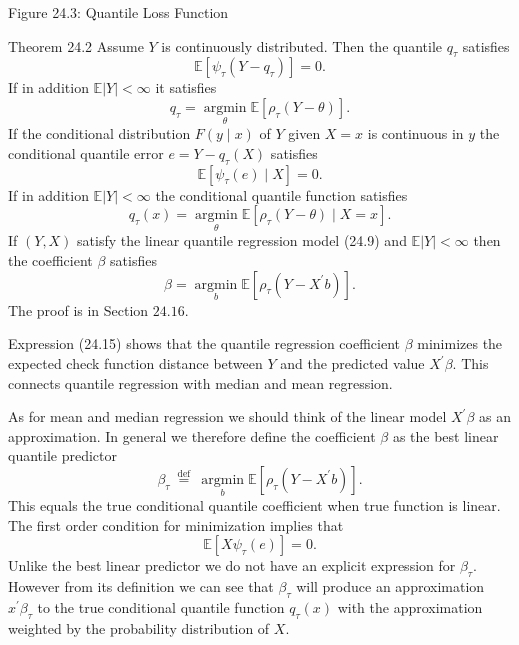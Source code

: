 \documentclass[10pt]{article}
\begin{document}
Figure 24.3: Quantile Loss Function

Theorem 24.2 Assume $Y$ is continuously distributed. Then the quantile $q_{\tau}$ satisfies
$$
\mathbb{E}\left[\psi_{\tau}\left(Y-q_{\tau}\right)\right]=0 .
$$
If in addition $\mathbb{E}|Y|<\infty$ it satisfies
$$
q_{\tau}=\underset{\theta}{\operatorname{argmin}} \mathbb{E}\left[\rho_{\tau}(Y-\theta)\right] .
$$
If the conditional distribution $F(y \mid x)$ of $Y$ given $X=x$ is continuous in $y$ the conditional quantile error $e=Y-q_{\tau}(X)$ satisfies
$$
\mathbb{E}\left[\psi_{\tau}(e) \mid X\right]=0 .
$$
If in addition $\mathbb{E}|Y|<\infty$ the conditional quantile function satisfies
$$
q_{\tau}(x)=\underset{\theta}{\operatorname{argmin}} \mathbb{E}\left[\rho_{\tau}(Y-\theta) \mid X=x\right] .
$$
If $(Y, X)$ satisfy the linear quantile regression model (24.9) and $\mathbb{E}|Y|<\infty$ then the coefficient $\beta$ satisfies
$$
\beta=\underset{b}{\operatorname{argmin}} \mathbb{E}\left[\rho_{\tau}\left(Y-X^{\prime} b\right)\right] .
$$
The proof is in Section $24.16$.

Expression (24.15) shows that the quantile regression coefficient $\beta$ minimizes the expected check function distance between $Y$ and the predicted value $X^{\prime} \beta$. This connects quantile regression with median and mean regression.

As for mean and median regression we should think of the linear model $X^{\prime} \beta$ as an approximation. In general we therefore define the coefficient $\beta$ as the best linear quantile predictor
$$
\beta_{\tau} \stackrel{\text { def }}{=} \underset{b}{\operatorname{argmin}} \mathbb{E}\left[\rho_{\tau}\left(Y-X^{\prime} b\right)\right] .
$$
This equals the true conditional quantile coefficient when true function is linear. The first order condition for minimization implies that
$$
\mathbb{E}\left[X \psi_{\tau}(e)\right]=0 .
$$
Unlike the best linear predictor we do not have an explicit expression for $\beta_{\tau}$. However from its definition we can see that $\beta_{\tau}$ will produce an approximation $x^{\prime} \beta_{\tau}$ to the true conditional quantile function $q_{\tau}(x)$ with the approximation weighted by the probability distribution of $X$.
\end{document}

